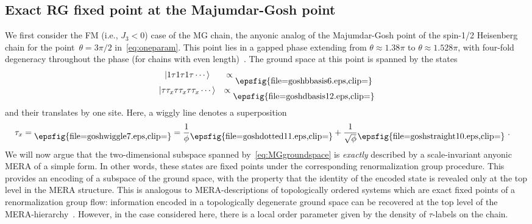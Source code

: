 \documentclass[floats,prb,twocolumn]{revtex4}
\newcommand{\ket}[1]{|#1\rangle}
\newcommand*{\goshbbasis}{\raisebox{-7.260pt}{\epsfig{file=goshbbasis6.eps,clip=}}}
\newcommand*{\goshwiggle}{\raisebox{-4.500pt}{\epsfig{file=goshwiggle7.eps,clip=}}}
\newcommand*{\goshstraight}{\raisebox{-4.500pt}{\epsfig{file=goshstraight10.eps,clip=}}}
\newcommand*{\goshdotted}{\raisebox{-4.500pt}{\epsfig{file=goshdotted11.eps,clip=}}}
\newcommand*{\goshdbasis}{\raisebox{-7.260pt}{\epsfig{file=goshdbasis12.eps,clip=}}}
\begin{document}
 


\subsection{Exact RG fixed point at the Majumdar-Gosh point\label{sec:exactfixedpoint}}
We first consider the FM (i.e., $J_3<0$) case of the MG chain, the anyonic analog of the Majumdar-Gosh point of the spin-1/2 Heisenberg chain for the point~$\theta=3\pi/2$ in~\eqref{eq:oneparam}. This point lies in a gapped phase extending from $\theta\approx 1.38\pi$ to $\theta\approx 1.528\pi$, with
four-fold degeneracy throughout the phase (for chains with even length)~\cite{trebstetalcollective08}. The ground space at this point is  spanned by the states
\begin{align}
\begin{matrix}
\ket{1\tau 1\tau 1\tau\cdots }&\propto \goshbbasis\\
\ket{\tau\tau_x\tau\tau_x\tau\tau_x\cdots}&\propto\goshdbasis
\end{matrix}\label{eq:MGgroundspace}
\end{align}
and their translates by one site. Here,  a wiggly line denotes a superposition
\begin{align*}
\tau_x&=\goshwiggle=\frac{1}{\phi}\goshdotted+\frac{1}{\sqrt{\phi}}\goshstraight\ .
\end{align*}
We will now argue that the two-dimensional subspace spanned by~\eqref{eq:MGgroundspace} is {\em exactly} described by a scale-invariant anyonic MERA of a simple form. In other words, these states are fixed points under the corresponding renormalization group procedure. This provides an encoding of a subspace of the ground space, with the property that the identity of the encoded state is  revealed only at the top level in the MERA structure.  This is analogous to MERA-descriptions of topologically ordered systems which are exact fixed points of a renormalization group flow: information encoded in a topologically degenerate ground space can be recovered at the top level of the MERA-hierarchy~\cite{AguadoVidal08,KoeReiVid09}. However, in the  case considered here, there is a local order parameter given by the density of $\tau$-labels on the chain.
\end{document}

